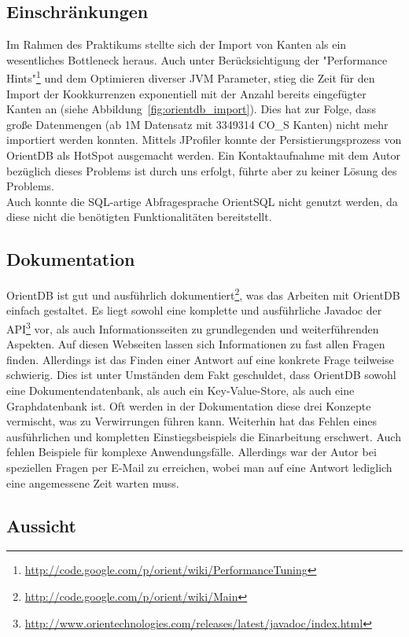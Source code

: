 \documentclass[11pt, a4paper, oneside]{article} %
\begin{document}
\subsection{Einschränkungen}

Im Rahmen des Praktikums stellte sich der Import von Kanten als ein wesentliches Bottleneck heraus. Auch unter Berücksichtigung der "Performance Hints"\footnote{\url{http://code.google.com/p/orient/wiki/PerformanceTuning}} und dem Optimieren diverser JVM Parameter, stieg die Zeit für den Import der Kookkurrenzen exponentiell mit der Anzahl bereits eingefügter Kanten an (siehe Abbildung~\ref{fig:orientdb_import}). Dies hat zur Folge, dass große Datenmengen (ab 1M Datensatz mit 3349314 CO\_{}S Kanten) nicht mehr importiert werden konnten. Mittels JProfiler konnte der Persistierungsprozess von OrientDB als HotSpot ausgemacht werden. Ein Kontaktaufnahme mit dem Autor bezüglich dieses Problems ist durch uns erfolgt, führte aber zu keiner Lösung des Problems.\\
Auch konnte die SQL-artige Abfragesprache OrientSQL nicht genutzt werden, da diese nicht die benötigten Funktionalitäten bereitstellt.

\subsection{Dokumentation}

OrientDB ist gut und ausführlich dokumentiert\footnote{\url{http://code.google.com/p/orient/wiki/Main}}, was das Arbeiten mit OrientDB einfach gestaltet. Es liegt sowohl eine komplette und ausführliche Javadoc der API\footnote{\url{http://www.orientechnologies.com/releases/latest/javadoc/index.html}} vor, als auch Informationsseiten zu grundlegenden und weiterführenden Aspekten. Auf diesen Webseiten lassen sich Informationen zu fast allen Fragen finden. Allerdings ist das Finden einer Antwort auf eine konkrete Frage teilweise schwierig. Dies ist unter Umständen dem Fakt geschuldet, dass OrientDB sowohl eine Dokumentendatenbank, als auch ein Key-Value-Store, als auch eine Graphdatenbank ist. Oft werden in der Dokumentation diese drei Konzepte vermischt, was zu Verwirrungen führen kann. Weiterhin hat das Fehlen eines ausführlichen und kompletten Einstiegsbeispiels die Einarbeitung erschwert. Auch fehlen Beispiele für komplexe Anwendungsfälle. Allerdings war der Autor bei speziellen Fragen per E-Mail zu erreichen, wobei man auf eine Antwort lediglich eine angemessene Zeit warten muss.

\subsection{Aussicht}
\end{document}
